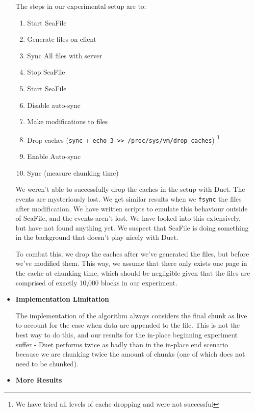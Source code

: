 \documentclass[table]{article}
\newcommand{\code}[1]{\texttt{#1}}
\begin{document}
\begin{multicols}{2}
\begin{itemize}
        The steps in our experimental setup are to:
        \begin{enumerate}
            \item Start SeaFile
            \item Generate files on client
            \item Sync All files with server
            \item Stop SeaFile
            \item Start SeaFile
            \item Disable auto-sync
            \item Make modifications to files
            \item Drop caches (\code{sync} + \code{echo 3 >> /proc/sys/vm/drop\_caches}) \footnote{We have tried all levels of cache dropping and were not successful}
            \item Enable Auto-sync
            \item Sync (measure chunking time)
        \end{enumerate}
        
        We weren't able to successfully drop the caches in the setup with Duet. The events are mysteriously lost. We get similar results when we \code{fsync} the files after modification. We have written scripts to emulate this behaviour outside of SeaFile, and the events aren't lost. We have looked into this extensively, but have not found anything yet. We suspect that SeaFile is doing something in the background that doesn't play nicely with Duet.
        
        To combat this, we drop the caches after we've generated the files, but before we've modified them. This way, we assume that there only exists one page in the cache at chunking time, which should be negligible given that the files are comprised of exactly 10,000 blocks in our experiment.
        \item \textbf{Implementation Limitation}
        
            The implementation of the algorithm always considers the final chunk as live to account for the case when data are appended to the file. This is not the best way to do this, and our results for the in-place beginning experiment suffer - Duet performs twice as badly than in the in-place end scenario because we are chunking twice the amount of chunks (one of which does not need to be chunked).
        \item \textbf{More Results}
        

\end{itemize}
\end{multicols}
\end{document}
